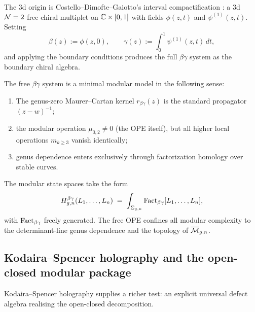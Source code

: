 The 3d origin is Costello--Dimofte--Gaiotto's interval compactification \cite{CDG20}:
a 3d $\mathcal N=2$ free chiral multiplet on $\mathbb C \times [0,1]$ with fields $\phi(z,t)$ and
$\psi^{(1)}(z,t)$. Setting
\begin{equation}
\label{eq:betagamma-interval}
\beta(z) := \phi(z,0),
\qquad
\gamma(z) := \int_0^1 \psi^{(1)}(z,t)\,dt,
\end{equation}
and applying the boundary conditions produces the full $\beta\gamma$ system as the
boundary chiral algebra.

\begin{proposition}
\label{prop:betagamma-modular-content}
The free $\beta\gamma$ system is a minimal modular model in the following sense:
\begin{enumerate}[label=\textup{(\roman*)}]
\item The genus-zero Maurer--Cartan kernel $r_{\beta\gamma}(z)$ is the standard propagator
 $(z-w)^{-1}$;
\item the modular operation $\mu_{0,2} \neq 0$ (the OPE itself), but all higher local
 operations $m_{k \geq 3}$ vanish identically;
\item genus dependence enters exclusively through factorization homology over stable curves.
\end{enumerate}
\end{proposition}

The modular state spaces take the form
\begin{equation}
\label{eq:betagamma-state-spaces}
H_{g,n}^{\beta\gamma}(L_1,\dots,L_n)
\;=\;
\int_{\Sigma_{g,n}} \operatorname{Fact}_{\beta\gamma}[L_1,\dots,L_n],
\end{equation}
with $\operatorname{Fact}_{\beta\gamma}$ freely generated. The free OPE confines all
modular complexity to the determinant-line genus dependence and the
topology of $\overline{\mathcal M}_{g,n}$.

\subsection{Kodaira--Spencer holography and the open-closed modular package}
\label{subsec:kodaira-spencer-holography}

Kodaira--Spencer holography supplies a richer test: an explicit
universal defect algebra realising the open-closed decomposition.

